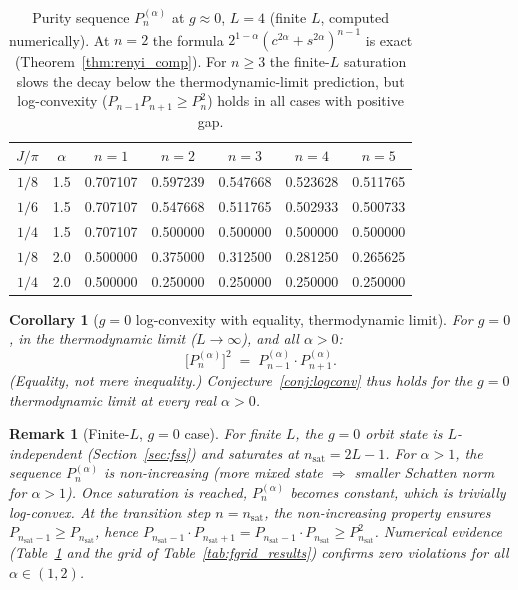 \documentclass[12pt,a4paper]{article}
\newtheorem{corollary}[theorem]{Corollary}
\newtheorem{remark}[theorem]{Remark}
\begin{document}
\begin{table}[h!]
\centering
\caption{Purity sequence $P_n^{(\alpha)}$ at $g\approx0$, $L=4$ (finite $L$, computed numerically).
At $n=2$ the formula $2^{1-\alpha}(c^{2\alpha}+s^{2\alpha})^{n-1}$ is exact (Theorem~\ref{thm:renyi_comp}).
For $n\geq 3$ the finite-$L$ saturation slows the decay below the thermodynamic-limit prediction,
but log-convexity ($P_{n-1}P_{n+1}\geq P_n^2$) holds in all cases with positive gap.}
\label{tab:single_exp_verify}
\begin{tabular}{c|c|ccccc}
$J/\pi$ & $\alpha$ & $n=1$ & $n=2$ & $n=3$ & $n=4$ & $n=5$ \\
\hline
$1/8$ & 1.5  & 0.707107 & 0.597239 & 0.547668 & 0.523628 & 0.511765 \\
$1/6$ & 1.5  & 0.707107 & 0.547668 & 0.511765 & 0.502933 & 0.500733 \\
$1/4$ & 1.5  & 0.707107 & 0.500000 & 0.500000 & 0.500000 & 0.500000 \\
$1/8$ & 2.0  & 0.500000 & 0.375000 & 0.312500 & 0.281250 & 0.265625 \\
$1/4$ & 2.0  & 0.500000 & 0.250000 & 0.250000 & 0.250000 & 0.250000 \\
\end{tabular}
\end{table}

\begin{corollary}[$g=0$ log-convexity with equality, thermodynamic limit]
\label{cor:g0_logconv}
For $g=0$, in the thermodynamic limit ($L\to\infty$), and all $\alpha>0$:
\[
  \bigl[P_n^{(\alpha)}\bigr]^2 \;=\; P_{n-1}^{(\alpha)}\cdot P_{n+1}^{(\alpha)}.
\]
(Equality, not mere inequality.)
Conjecture~\ref{conj:logconv} thus holds for the $g=0$ thermodynamic limit
at every real $\alpha>0$.
\end{corollary}

\begin{remark}[Finite-$L$, $g=0$ case]
\label{rem:finiteL_g0}
For finite $L$, the $g=0$ orbit state is $L$-independent (Section~\ref{sec:fss}) and
saturates at $n_\mathrm{sat}=2L-1$.  For $\alpha>1$, the sequence $P_n^{(\alpha)}$
is non-increasing (more mixed state $\Rightarrow$ smaller Schatten norm for $\alpha>1$).
Once saturation is reached, $P_n^{(\alpha)}$ becomes constant, which is trivially
log-convex.  At the transition step $n=n_\mathrm{sat}$, the non-increasing property
ensures $P_{n_\mathrm{sat}-1}\geq P_{n_\mathrm{sat}}$, hence
$P_{n_\mathrm{sat}-1}\cdot P_{n_\mathrm{sat}+1}=P_{n_\mathrm{sat}-1}\cdot P_{n_\mathrm{sat}}
\geq P_{n_\mathrm{sat}}^2$.  Numerical evidence (Table~\ref{tab:single_exp_verify} and the
grid of Table~\ref{tab:fgrid_results}) confirms zero violations for all $\alpha\in(1,2)$.
\end{remark}
\end{document}

